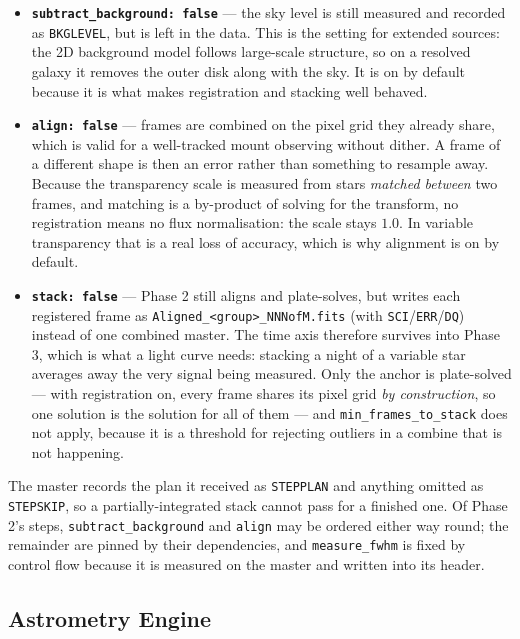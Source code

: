 \documentclass[11pt,a4paper]{article}
\begin{document}
\begin{itemize}[leftmargin=*]
    \item \textbf{\texttt{subtract\_background: false}} --- the sky level is still measured and recorded as \texttt{BKGLEVEL}, but is left in the data. This is the setting for extended sources: the 2D background model follows large-scale structure, so on a resolved galaxy it removes the outer disk along with the sky. It is on by default because it is what makes registration and stacking well behaved.
    \item \textbf{\texttt{align: false}} --- frames are combined on the pixel grid they already share, which is valid for a well-tracked mount observing without dither. A frame of a different shape is then an error rather than something to resample away. Because the transparency scale is measured from stars \emph{matched between} two frames, and matching is a by-product of solving for the transform, no registration means no flux normalisation: the scale stays $1.0$. In variable transparency that is a real loss of accuracy, which is why alignment is on by default.
    \item \textbf{\texttt{stack: false}} --- Phase 2 still aligns and plate-solves, but writes each registered frame as \texttt{Aligned\_<group>\_NNNofM.fits} (with \texttt{SCI}/\texttt{ERR}/\texttt{DQ}) instead of one combined master. The time axis therefore survives into Phase 3, which is what a light curve needs: stacking a night of a variable star averages away the very signal being measured. Only the anchor is plate-solved --- with registration on, every frame shares its pixel grid \emph{by construction}, so one solution is the solution for all of them --- and \texttt{min\_frames\_to\_stack} does not apply, because it is a threshold for rejecting outliers in a combine that is not happening.
\end{itemize}

\begin{sloppypar}
The master records the plan it received as \texttt{STEPPLAN} and anything omitted
as \texttt{STEPSKIP}, so a partially-integrated stack cannot pass for a finished
one. Of Phase 2's steps, \texttt{subtract\_background} and \texttt{align} may be
ordered either way round; the remainder are pinned by their dependencies, and
\texttt{measure\_fwhm} is fixed by control flow because it is measured on the
master and written into its header.
\end{sloppypar}

\subsection{Astrometry Engine}
\end{document}
